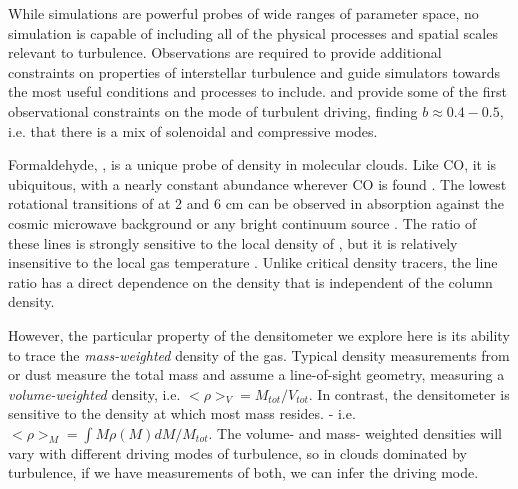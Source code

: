 While simulations are powerful probes of wide ranges of parameter space, no
simulation is capable of including all of the physical processes and spatial
scales relevant to turbulence.  Observations are required to provide additional
constraints on properties of interstellar turbulence and guide simulators
towards the most useful conditions and processes to include.
\citet{Brunt2010c,Kainulainen2012a} and \citet{Kainulainen2013a} provide some of the first
observational constraints on the mode of turbulent driving, finding
$b\approx0.4-0.5$, i.e. that there is a mix of solenoidal and compressive modes.


Formaldehyde, \formaldehyde, is a unique probe of density in molecular clouds.
Like CO, it is ubiquitous, with a nearly constant abundance wherever CO is
found \citep{Mangum1993a,Tang2013a}.  The lowest rotational transitions of
\ortho at 2 and 6 cm can be observed in absorption against the cosmic microwave
background or any bright continuum source \citep{Ginsburg2011a,Darling2012b}.
The ratio of these lines is strongly sensitive to the local density of \hh, but
it is relatively insensitive to the local gas temperature
\citep{Troscompt2009a,Wiesenfeld2013a}.  Unlike critical density tracers, the
\formaldehyde line ratio has a direct dependence on the density that is
independent of the column density.

However, the particular property of the \formaldehyde densitometer we explore
here is its ability to trace the \emph{mass-weighted} density of the gas.
Typical density measurements from \thirteenco or dust measure the total mass
and assume a line-of-sight geometry, measuring a \emph{volume-weighted}
density, i.e. $<\rho>_V = M_{tot}/V_{tot}$.  In contrast, the \formaldehyde
densitometer is sensitive to the density at which most mass resides.
 - i.e. $<\rho>_M = \int M \rho(M) d M / M_{tot}$.  
The volume- and mass- weighted densities will vary with different driving modes
of turbulence, so in clouds dominated by turbulence, if we have measurements of
both, we can infer the driving mode.

